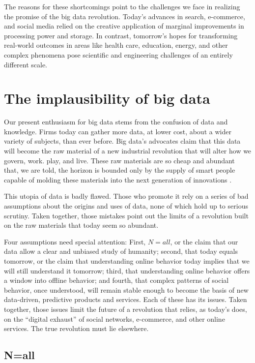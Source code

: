 \documentclass[12pt]{article}
\begin{document}
The reasons for these shortcomings point to the challenges we face in
realizing the promise of the big data revolution. Today's advances in
search, e-commerce, and social media relied on the creative
application of marginal improvements in processing power and
storage. In contrast, tomorrow's hopes for transforming real-world
outcomes in areas like health care, education, energy, and other
complex phenomena pose scientific and engineering challenges of an
entirely different scale. 


\section{The implausibility of big data}
\label{sec:convention-reality}


Our present enthusiasm for big data stems from the confusion of data
and knowledge. Firms today can gather more data, at lower cost, about
a wider variety of subjects, than ever before. Big data's
advocates claim that this data will become the raw material of a new
industrial revolution that will alter how we govern, work. play, and
live. These raw materials are so cheap and abundant that, we are told,
the horizon is bounded only by the supply of smart people capable of
molding these materials into
the next generation of innovations \citep{mckinsey2011}. 

This utopia of data is badly flawed. Those who promote it rely on a
series of bad assumptions about the origins and uses of data, none of
which hold up to serious scrutiny. Taken together, those mistakes
point out the limits of a revolution built on the raw materials that
today seem so abundant. 

Four assumptions need special attention: First, $N=all$, or the claim
that our data allow a clear and unbiased study of humanity; second,
that today equals tomorrow, or the claim that understanding online
behavior today implies that we will still understand it tomorrow;
third, that understanding online behavior offers a window into offline
behavior; and fourth, that complex patterns of social behavior, once
understood, will remain stable enough to become the basis of new
data-driven, predictive products and services. Each of these has its
issues. Taken together, those issues limit the future of a revolution
that relies, as today's does, on the ``digital exhaust'' of social
networks, e-commerce, and other online services. The true revolution
must lie elsewhere. 

\subsection{N=all}
\label{sec:n-equals-all}
\end{document}
